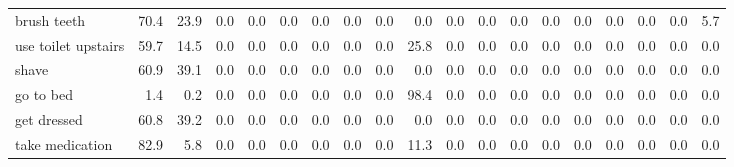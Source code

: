 \documentclass{article}
\begin{document}
\begin{sideways}
\begin{tabular}{lrrrrrrrrrrrrrrrrrr}
brush teeth                   &        70.4 &               23.9 &           0.0 &                          0.0 &                0.0 &                0.0 &                        0.0 &          0.0 &              0.0 &                0.0 &                    0.0 &                      0.0 &                  0.0 &                   0.0 &              0.0 &              0.0 &                                  0.0 &          5.7 \\
use toilet upstairs           &        59.7 &               14.5 &           0.0 &                          0.0 &                0.0 &                0.0 &                        0.0 &          0.0 &             25.8 &                0.0 &                    0.0 &                      0.0 &                  0.0 &                   0.0 &              0.0 &              0.0 &                                  0.0 &          0.0 \\
shave                         &        60.9 &               39.1 &           0.0 &                          0.0 &                0.0 &                0.0 &                        0.0 &          0.0 &              0.0 &                0.0 &                    0.0 &                      0.0 &                  0.0 &                   0.0 &              0.0 &              0.0 &                                  0.0 &          0.0 \\
go to bed                     &         1.4 &                0.2 &           0.0 &                          0.0 &                0.0 &                0.0 &                        0.0 &          0.0 &             98.4 &                0.0 &                    0.0 &                      0.0 &                  0.0 &                   0.0 &              0.0 &              0.0 &                                  0.0 &          0.0 \\
get dressed                   &        60.8 &               39.2 &           0.0 &                          0.0 &                0.0 &                0.0 &                        0.0 &          0.0 &              0.0 &                0.0 &                    0.0 &                      0.0 &                  0.0 &                   0.0 &              0.0 &              0.0 &                                  0.0 &          0.0 \\
take medication               &        82.9 &                5.8 &           0.0 &                          0.0 &                0.0 &                0.0 &                        0.0 &          0.0 &             11.3 &                0.0 &                    0.0 &                      0.0 &                  0.0 &                   0.0 &              0.0 &              0.0 &                                  0.0 &          0.0 \\

\end{tabular}
\end{sideways}
\end{document}
